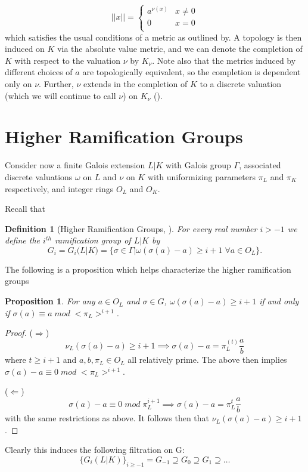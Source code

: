 \documentclass[paper=a4, fontsize=11pt]{scrartcl} %
\numberwithin{equation}{section} %
\numberwithin{figure}{section} %
\numberwithin{table}{section} %
\theoremstyle{break}
\newtheorem{defn}{Definition}
\newtheorem{prop}{Proposition}
\begin{document}
\[ ||x|| =  \begin{cases} 
      a^{\nu(x)} & x \not= 0 \\
      0 & x = 0 \\
   \end{cases}
\]
which satisfies the usual conditions of a metric as outlined by. A topology is then induced on $K$ via the absolute value metric, and we can denote the completion of $K$ with respect to the valuation $\nu$ by $K_\nu$. Note also that the metrics induced by different choices of $a$ are topologically equivalent, so the completion is dependent only on $\nu$. Further, $\nu$ extends in the completion of $K$ to a discrete valuation (which we will continue to call $\nu$) on $K_\nu$ (\cite{Serre}).

\section{Higher Ramification Groups}
Consider now a finite Galois extension $L|K$ with Galois group $\Gamma$, associated discrete valuations $\omega$ on $L$ and $\nu$ on $K$ with uniformizing parameters $\pi_L$ and $\pi_K$ respectively, and integer rings $O_L$ and $O_K$.

Recall that 
\begin{defn}[Higher Ramification Groups, \cite{Serre}]
For every real number $i > -1$ we define the $i^{th}$ ramification group of $L|K$ by
$$
G_i = G_i(L|K) = \{\sigma \in \Gamma | \omega(\sigma(a)-a)\geq i+1 \;\forall a \in O_L\}.
$$
\end{defn}
The following is a proposition which helps characterize the higher ramification groups
\begin{prop}
For any $a \in O_L$ and $\sigma \in G$, $\omega(\sigma(a) - a) \geq i+1$ if and only if  $\sigma(a) \equiv a \; mod \; <\pi_L>^{i+1}$.
\end{prop}
\begin{proof}

($\Rightarrow$)
$$
\nu_L(\sigma(a)-a) \geq i+1 \implies \sigma(a)-a = \pi_L^(t)\frac{a}{b}
$$
where $t \geq i+1$ and $a,b,\pi_L\in O_L$ all relatively prime. The above then implies $\sigma(a)-a \equiv 0 \; mod \; <\pi_L>^{i+1}$.

($\Leftarrow$) $$\sigma(a)-a \equiv 0 \; mod \; \pi_L^{i+1} \implies \sigma(a)-a = \pi_L^{t}\frac{a}{b}$$
with the same restrictions as above. It follows then that $\nu_L(\sigma(a)-a) \geq i+1$.
\end{proof}
Clearly this induces the following filtration on G:
$$
\{G_i(L|K)\}_{i\geq -1} = G_{-1} \supseteq G_0 \supseteq G_1 \supseteq \ldots
$$
\end{document}
